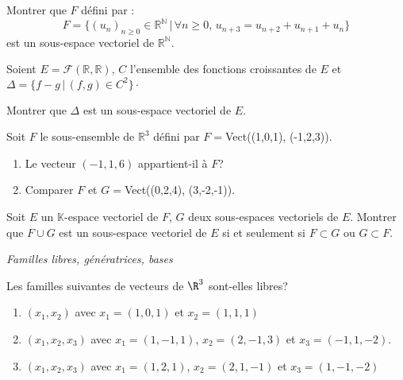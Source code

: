 \documentclass[a4paper,10pt]{report}
\begin{document}
\begin{Exa} Montrer que $F$ défini par :
$$ F = \lbrace (u_n)_{n \geq 0} \in \mathbb{R}^{\mathbb{N}} \, \vert \, \forall n \geq 0, \, u_{n+3}=u_{n+2}+u_{n+1}+u_n \rbrace$$
est un sous-espace vectoriel de $\mathbb{R}^{\mathbb{N}}$.
\end{Exa}

\begin{Exa} Soient $E = \mathcal{F}(\mathbb{R}, \mathbb{R})$, $C$ l'ensemble des fonctions croissantes de $E$ et $\Delta = \lbrace f-g \, \vert \, (f,g) \in C^2 \rbrace\cdot$

\noindent Montrer que $\Delta$ est un sous-espace vectoriel de $E$.
\end{Exa}



\begin{Exa} Soit $F$ le sous-ensemble de $\mathbb{R}^3$ défini par $F=$Vect((1,0,1), (-1,2,3)). 
\begin{enumerate}
\item Le vecteur $(-1,1,6)$ appartient-il à $F$?
\item Comparer $F$ et $G=$Vect((0,2,4), (3,-2,-1)). 
\end{enumerate}
\end{Exa}

\begin{Exa} Soit $E$ un $\mathbb{K}$-espace vectoriel de $F$, $G$ deux sous-espaces vectoriels de $E$. Montrer que $F \cup G$ est un sous-espace vectoriel de $E$ si et seulement si $F \subset G$ ou $G \subset F$.
\end{Exa}

\medskip

\begin{center}
\textit{{ {\large Familles libres, génératrices, bases}}}
\end{center}

\medskip

\begin{Exa} Les familles suivantes de vecteurs de $\R^3$ sont-elles libres?
   \begin{enumerate}
  \item
        $(x_1 ,x_2)$ avec $x_1 = (1,0,1)$ et $x_2 = (1,1,1)$
      \item
        $(x_1 ,x_2 ,x_3)$ avec $x_1 = (1, - 1,1)$, $x_2 = (2, - 1,3)$ et $x_3 = ( - 1,1, - 2)$.
      \item
        $(x_1 ,x_2 ,x_3)$ avec $x_1 = (1,2,1)$, $x_2 = (2,1, - 1)$ et $x_3 = (1, - 1, - 2)$
    \end{enumerate}
\end{Exa}
\end{document}
